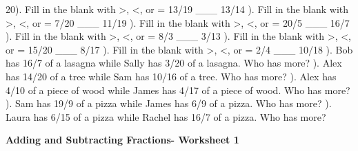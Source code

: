 \documentclass{article}%
\begin{document}
20). Fill in the blank with >, <, or = 13/19 \_\_\_ 13/14%
\newline%
\newline%
). Fill in the blank with >, <, or = 7/20 \_\_\_ 11/19%
\newline%
\newline%
). Fill in the blank with >, <, or = 20/5 \_\_\_ 16/7%
\newline%
\newline%
). Fill in the blank with >, <, or = 8/3 \_\_\_ 3/13%
\newline%
\newline%
). Fill in the blank with >, <, or = 15/20 \_\_\_ 8/17%
\newline%
\newline%
). Fill in the blank with >, <, or = 2/4 \_\_\_ 10/18%
\newline%
\newline%
). Bob has 16/7 of a lasagna while Sally has 3/20 of a lasagna. Who has more?%
\newline%
\newline%
). Alex has 14/20 of a tree while Sam has 10/16 of a tree. Who has more?%
\newline%
\newline%
). Alex has 4/10 of a piece of wood while James has 4/17 of a piece of wood. Who has more?%
\newline%
\newline%
). Sam has 19/9 of a pizza while James has 6/9 of a pizza. Who has more?%
\newline%
\newline%
). Laura has 6/15 of a pizza while Rachel has 16/7 of a pizza. Who has more?%
\newline%
\newline%
\newline%
\pagebreak%
\large%
\begin{center}%
\textbf{Adding and Subtracting Fractions- Worksheet 1}%
\newline%
\newline%
\newline%
\end{center} \normalsize%
\end{document}
